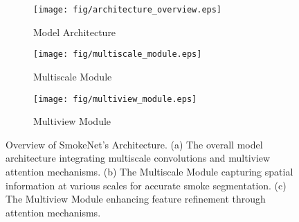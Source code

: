 \begin{figure*}[htbp]
    \centering
    \begin{minipage}{0.45\linewidth}
        \centering
        \begin{subfigure}[b]{\linewidth}
            \centering
            \texttt{[image: fig/architecture\_overview.eps]}
            \caption{Model Architecture}
            \label{fig:arch_overview}
        \end{subfigure}
    \end{minipage}
    \hfill
    \begin{minipage}{0.50\linewidth}
        \centering
        \begin{subfigure}[b]{\linewidth}
            \centering
            \texttt{[image: fig/multiscale\_module.eps]}
            \caption{Multiscale Module}
            \label{fig:multiscale_module}
        \end{subfigure}
        
        \vspace{0.5cm} %
        
        \begin{subfigure}[b]{\linewidth}
            \centering
            \texttt{[image: fig/multiview\_module.eps]}
            \caption{Multiview Module}
            \label{fig:multiview_module}
        \end{subfigure}
    \end{minipage}
    
    \caption{Overview of SmokeNet's Architecture. (a) The overall model architecture integrating multiscale convolutions and multiview attention mechanisms.  (b) The Multiscale Module capturing spatial information at various scales for accurate smoke segmentation.  (c) The Multiview Module enhancing feature refinement through attention mechanisms.}
    \label{fig:combined_architecture}
\end{figure*}
